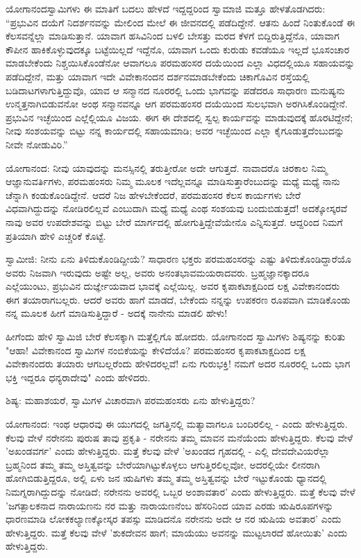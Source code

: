 ಯೋಗಾನಂದಸ್ವಾಮಿಗಳು ಈ ಮಾತಿಗೆ ಬದಲು ಹೇಳದೆ ಇದ್ದದ್ದರಿಂದ ಸ್ವಾಮಾಜಿ ಮತ್ತೂ ಹೇಳತೊಡಗಿದರು: “ಪ್ರಭುವಿನ ದಯೆಗೆ ನಿದರ್ಶನವನ್ನು ಮೇಲಿಂದ ಮೇಲೆ ಈ ಜೀವನದಲ್ಲಿ ಪಡೆದಿದ್ದೇನೆ. ಆತನು ಹಿಂದೆ ನಿಂತುಕೊಂಡೆ ಈ ಕೆಲಸವನ್ನೆಲ್ಲಾ ಮಾಡಿಸುತ್ತಾನೆ. ಯಾವಾಗ ಹಸಿವಿನಿಂದ ಬಳಲಿ ಬೇಸತ್ತು ಮರದ ಕೆಳಗೆ ಬಿದ್ದಿರುತ್ತಿದ್ದೆನೊ, ಯಾವಾಗ ಕೌಪೀನ ಹಾಕಿಕೊಳ್ಳುವುದಕ್ಕೂ ಬಟ್ಟೆಯಿಲ್ಲದೆ ಇದ್ದೆನೊ, ಯಾವಾಗ ಒಂದು ಕುರುಡು ಕವಡೆಯೂ ಇಲ್ಲದೆ ಭೂಸಂಚಾರ ಮಾಡಬೇಕೆಂದು ನಿಶ್ಚಯಿಸಿಕೊಂಡೆನೋ ಆವಾಗಲೂ ಪರಮಹಂಸರ ದಯೆಯಿಂದ ಎಲ್ಲಾ ವಿಧದಲ್ಲಿಯೂ ಸಹಾಯವನ್ನು ಪಡೆದಿದ್ದೇನೆ, ಮತ್ತು ಯಾವಾಗ ಇದೇ ವಿವೇಕಾನಂದನ ದರ್ಶನಮಾಡಬೇಕೆಂದು ಚಿಕಾಗೊವಿನ ರಸ್ತೆಯಲ್ಲಿ ಬಡಿದಾಟಗಳಾಗುತ್ತಿದ್ದುವೊ, ಯಾವ ಆ ಸನ್ಮಾನದ ನೂರರಲ್ಲಿ ಒಂದು ಭಾಗವನ್ನು ಪಡೆದರೂ ಸಾಧಾರಣ ಮನುಷ್ಯನು ಉನ್ಮತ್ತನಾಗಿಬಿಡುವನೋ ಅಂಥ ಸನ್ಮಾನವನ್ನೂ ಆಗ ಪರಮಹಂಸರ ದಯೆಯಿಂದ ಸುಲಭವಾಗಿ ಅರಗಿಸಿಕೊಂಡಿದ್ದೇನೆ. ಪ್ರಭುವಿನ ಇಚ್ಛೆಯಿಂದ ಎಲ್ಲೆಲ್ಲಿಯೂ ವಿಜಯ. ಈಗ ಈ ದೇಶದಲ್ಲಿ ಸ್ವಲ್ಪ ಕಾರ್ಯವನ್ನು ಮಾಡುವುದಕ್ಕೆ ಹೊರಟಿದ್ದೇನೆ; ನೀವು ಸಂಶಯವನ್ನು ಬಿಟ್ಟು ನನ್ನ ಕಾರ್ಯದಲ್ಲಿ ಸಹಾಯಮಾಡಿ; ಅವರ ಇಚ್ಛೆಯಿಂದ ಎಲ್ಲಾ ಕೈಗೂಡುತ್ತದೆಂಬುದನ್ನು ನೀವೇ ನೋಡುವಿರಿ.”

ಯೋಗಾನಂದ: ನೀವು ಯಾವುದನ್ನು ಮನಸ್ಸಿನಲ್ಲಿ ತರುತ್ತೀರೋ ಅದೇ ಆಗುತ್ತದೆ. ನಾವಾದರೊ ಚಿರಕಾಲ ನಿಮ್ಮ ಆಜ್ಞಾನುವರ್ತಿಗಳು, ಪರಮಹಂಸರು ನಿಮ್ಮ ಮೂಲಕ ಇದೆಲ್ಲವನ್ನೂ ಮಾಡಿಸುತ್ತಾರೆಂಬುದನ್ನು ಮಧ್ಯೆ ಮಧ್ಯೆ ನಾನು ಚೆನ್ನಾಗಿ ಕಂಡುಕೊಂಡಿದ್ದೇನೆ. ಆದರೆ ನಿಜ ಹೇಳಬೇಕೆಂದರೆ, ಪರಮಹಂಸರ ಕೆಲಸ ಕಾರ್ಯಗಳು ಬೇರೆ ವಿಧವಾಗಿದ್ದುದನ್ನು ನೋಡಿರಲಿಲ್ಲವೆ ಎಂಬುದಾಗಿ ಮಧ್ಯೆ ಮಧ್ಯೆ ಎಂಥ ಸಂಶಯವು ಬಂದುಬಿಡುತ್ತದೆ! ಅದಕ್ಕೋಸ್ಕರವೆ ನಾವು ಅವರ ಉಪದೇಶವನ್ನು ಬಿಟ್ಟು ಬೇರೆ ಮಾರ್ಗದಲ್ಲಿ ಹೋಗುತ್ತಿದ್ದೇವೆಯೇನೊ ಎನ್ನಿಸುತ್ತದೆ. ಆದ್ದರಿಂದ ನಿಮಗೆ ಪ್ರತಿಯಾಗಿ ಹೇಳಿ ಎಚ್ಚರಿಕೆ ಕೊಟ್ಟೆ.

ಸ್ವಾಮೀಜಿ: ನೀನು ಏನು ತಿಳಿದುಕೊಂಡಿದ್ದೀಯೆ? ಸಾಧಾರಣ ಭಕ್ತರು ಪರಮಹಂಸರನ್ನು ಎಷ್ಟು ತಿಳಿದುಕೊಂಡಿದ್ದಾರೆಯೊ ಅವರು ನಿಜವಾಗಿ ಇರುವುದು ಅಷ್ಟೇ ಅಲ್ಲ, ಅವರು ಅನಂತಭಾವಮಯರಾದವರು. ಬ್ರಹ್ಮಜ್ಞಾನಕ್ಕಾದರೂ ಎಲ್ಲೆಯುಂಟು, ಪ್ರಭುವಿನ ದುರ್ಜ್ಞೇಯವಾದ ಭಾವಕ್ಕೆ ಎಲ್ಲೆಯಿಲ್ಲ. ಅವರ ಕೃಪಾಕಟಾಕ್ಷದಿಂದ ಲಕ್ಷ ವಿವೇಕಾನಂದರು ಈಗ ತಯಾರಾಗಬಲ್ಲರು. ಆದರೆ ಅವರು ಹಾಗೆ ಮಾಡದೆ, ಬೇಕೆಂದು ನನ್ನನ್ನು ಉಪಕರಣ ರೂಪವಾಗಿ ಮಾಡಿಕೊಂಡು ನನ್ನ ಮೂಲಕ ಹೀಗೆ ಮಾಡಿಸುತ್ತಿದ್ದಾರೆ - ಅದಕ್ಕೆ ನಾನೇನು ಮಾಡಲಿ ಹೇಳು!

ಹೀಗೆಂದು ಹೇಳಿ ಸ್ವಾಮಿಜಿ ಬೇರೆ ಕೆಲಸಕ್ಕಾಗಿ ಮತ್ತೆಲ್ಲಿಗೊ ಹೋದರು. ಯೋಗಾನಂದ ಸ್ವಾಮಿಗಳು ಶಿಷ್ಯನನ್ನು ಕುರಿತು "ಆಹಾ! ವಿವೇಕಾನಂದ ಸ್ವಾಮಿಗಳ ನಂಬಿಕೆಯನ್ನು ಕೇಳಿದೆಯೊ? ಪರಮಹಂಸರ ಕೃಪಾಕಟಾಕ್ಷದಿಂದ ಲಕ್ಷ ವಿವೇಕಾನಂದರು ತಯಾರು ಆಗಬಲ್ಲರೆಂದು ಹೇಳಿದರಲ್ಲವೆ! ಏನು ಗುರುಭಕ್ತಿ! ನಮಗೆ ಅದರ ನೂರರಲ್ಲಿ ಒಂದು ಭಾಗ ಭಕ್ತಿ ಇದ್ದರೂ ಧನ್ಯರಾದೇವು" ಎಂದು ಹೇಳಿದರು.

ಶಿಷ್ಯ: ಮಹಾಶಯರೆ, ಸ್ವಾಮಿಗಳ ವಿಚಾರವಾಗಿ ಪರಮಹಂಸರು ಏನು ಹೇಳುತ್ತಿದ್ದರು?

ಯೋಗಾನಂದ: ಇಂಥ ಆಧಾರವು ಈ ಯುಗದಲ್ಲಿ ಜಗತ್ತಿನಲ್ಲಿ ಮತ್ಯಾವಾಗಲೂ ಬಂದಿರಲಿಲ್ಲ - ಎಂದು ಹೇಳುತ್ತಿದ್ದರು. ಕೆಲವು ವೇಳೆ ನರೇನನು ಪುರುಷ ತಾವು ಪ್ರಕೃತಿ - ನರೇನನು ತಮ್ಮ ಮಾವನ ಮನೆಯೆಂದು ಹೇಳುತ್ತಿದ್ದರು. ಕೆಲವು ವೇಳೆ 'ಅಖಂಡವರ್ಗ' ಎಂದು ಹೇಳುತ್ತಿದ್ದರು. ಮತ್ತೆ ಕೆಲವು ವೇಳೆ 'ಅಖಂಡದ ಗೃಹದಲ್ಲಿ - ಎಲ್ಲಿ ದೇವದೇವಿಯರೆಲ್ಲಾ ಬ್ರಹ್ಮನಿಂದ ತಮ್ಮ ತಮ್ಮ ಅಸ್ತಿತ್ವವನ್ನು ಬೇರೆಯಾಗಿಟ್ಟುಕೊಳ್ಳಲು ಆಗುತ್ತಿರಲಿಲ್ಲವೋ, ಅದರಲ್ಲಿಯೇ ಲೀನರಾಗಿ ಹೋಗಿಬಿಡುತ್ತಿದ್ದರೂ, ಅಲ್ಲಿ ಏಳು ಜನ ಋಷಿಗಳು ತಮ್ಮ ತಮ್ಮ ಅಸ್ತಿತ್ವವನ್ನು ಬೇರೆ ಇಟ್ಟುಕೊಂಡು ಧ್ಯಾನದಲ್ಲಿ ನಿಮಗ್ನರಾಗಿದ್ದುದನ್ನು ನೋಡಿದೆ; ನರೇನನು ಅವರಲ್ಲಿ ಒಬ್ಬರ ಅಂಶಾವತಾರ' ಎಂದು ಹೇಳುತ್ತಿದ್ದರು. ಮತ್ತೆ ಕೆಲವು ವೇಳೆ 'ಜಗತ್ಪಾಲಕನಾದ ನಾರಾಯಣನು ನರ ಮತ್ತು ನಾರಾಯಣನೆಂಬ ಹೆಸರಿನಿಂದ ಯಾವ ಎರಡು ಋಷಿರೂಪಗಳನ್ನು ಧಾರಣಮಾಡಿ ಲೋಕಕಲ್ಯಾಣಕ್ಕೋಸ್ಕರ ತಪಸ್ಸು ಮಾಡಿದನೊ ನರೇನನು ಅದೇ ಆ ನರ ಋಷಿಯ ಅವತಾರ' ಎಂದು ಹೇಳುತ್ತಿದ್ದರು. ಮತ್ತೆ ಕೆಲವು ವೇಳೆ 'ಶುಕದೇವನ ಹಾಗೆ; ಮಾಯೆಯು ಅವನನ್ನು ಮುಟ್ಟಲಾರದೆ ಹೋಯಿತು' ಎಂದು ಹೇಳುತ್ತಿದ್ದರು.

